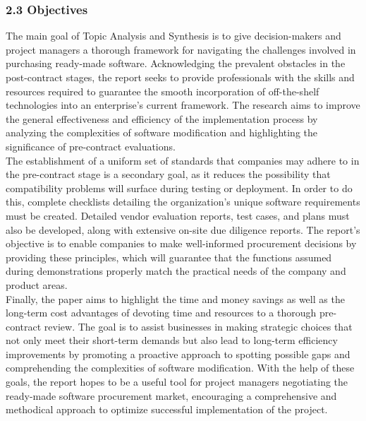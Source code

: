 \documentclass[letterpaper, 11pt]{report}
\begin{document}
\subsubsection*{2.3 Objectives}
\normalsize {The main goal of Topic Analysis and Synthesis is to give decision-makers and project managers a thorough framework for navigating the challenges involved in purchasing ready-made software. Acknowledging the prevalent obstacles in the post-contract stages, the report seeks to provide professionals with the skills and resources required to guarantee the smooth incorporation of off-the-shelf technologies into an enterprise's current framework. The research aims to improve the general effectiveness and efficiency of the implementation process by analyzing the complexities of software modification and highlighting the significance of pre-contract evaluations.\\

The establishment of a uniform set of standards that companies may adhere to in the pre-contract stage is a secondary goal, as it reduces the possibility that compatibility problems will surface during testing or deployment. In order to do this, complete checklists detailing the organization's unique software requirements must be created. Detailed vendor evaluation reports, test cases, and plans must also be developed, along with extensive on-site due diligence reports. The report's objective is to enable companies to make well-informed procurement decisions by providing these principles, which will guarantee that the functions assumed during demonstrations properly match the practical needs of the company and product areas.\\

Finally, the paper aims to highlight the time and money savings as well as the long-term cost advantages of devoting time and resources to a thorough pre-contract review. The goal is to assist businesses in making strategic choices that not only meet their short-term demands but also lead to long-term efficiency improvements by promoting a proactive approach to spotting possible gaps and comprehending the complexities of software modification. With the help of these goals, the report hopes to be a useful tool for project managers negotiating the ready-made software procurement market, encouraging a comprehensive and methodical approach to optimize successful implementation of the project.\\

 }
 
\end{document}
